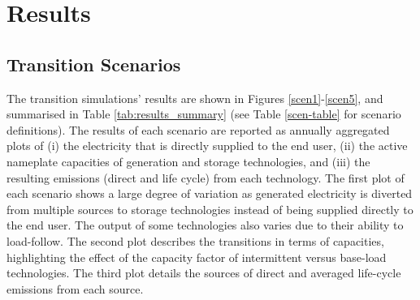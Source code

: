 \section{Results} \label{Results-and-discussion}

\subsection{Transition Scenarios}

The transition simulations' results are shown in Figures \ref{scen1}-\ref{scen5}, and summarised in Table \ref{tab:results_summary} (see Table \ref{scen-table} for scenario definitions).  The results of each scenario are reported as annually aggregated plots of (i) the electricity that is directly supplied to the end user, (ii) the active nameplate capacities of generation and storage technologies, and (iii) the resulting emissions (direct and life cycle) from each technology. The first plot of each scenario shows a large degree of variation as generated electricity is diverted from multiple sources to storage technologies instead of being supplied directly to the end user. The output of some technologies also varies due to their ability to load-follow. The second plot describes the transitions in terms of capacities, highlighting the effect of the capacity factor of intermittent versus base-load technologies. The third plot details the sources of direct and averaged life-cycle emissions from each source.

